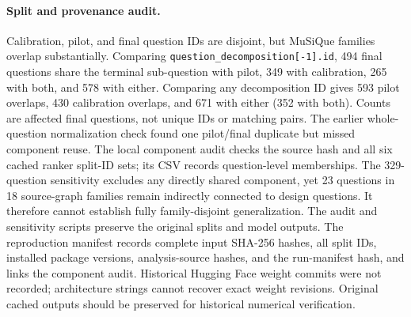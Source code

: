 \paragraph{Split and provenance audit.}
Calibration, pilot, and final question IDs are disjoint, but MuSiQue families overlap substantially. Comparing \texttt{question\_decomposition[-1].id}, 494 final questions share the terminal sub-question with pilot, 349 with calibration, 265 with both, and 578 with either. Comparing any decomposition ID gives 593 pilot overlaps, 430 calibration overlaps, and 671 with either (352 with both). Counts are affected final questions, not unique IDs or matching pairs. The earlier whole-question normalization check found one pilot/final duplicate but missed component reuse. The local component audit checks the source hash and all six cached ranker split-ID sets; its CSV records question-level memberships. The 329-question sensitivity excludes any directly shared component, yet 23 questions in 18 source-graph families remain indirectly connected to design questions. It therefore cannot establish fully family-disjoint generalization. The audit and sensitivity scripts preserve the original splits and model outputs. The reproduction manifest records complete input SHA-256 hashes, all split IDs, installed package versions, analysis-source hashes, and the run-manifest hash, and links the component audit. Historical Hugging Face weight commits were not recorded; architecture strings cannot recover exact weight revisions. Original cached outputs should be preserved for historical numerical verification.
